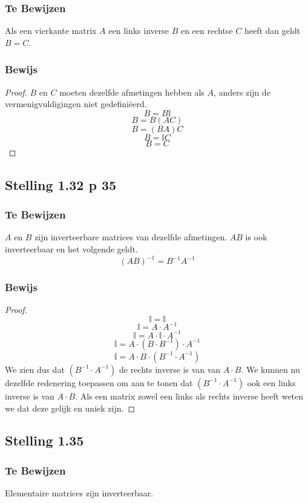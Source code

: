 \documentclass[lineaire_algebra_oplossingen.tex]{subfiles}
\begin{document}
\subsubsection*{Te Bewijzen}
Als een vierkante matrix $A$ een links inverse $B$ en een rechtse $C$ heeft dan geldt $B=C$.

\subsubsection*{Bewijs}
\begin{proof}
$B$ en $C$ moeten dezelfde afmetingen hebben als $A$, anders zijn de vermenigvuldigingen niet gedefini\"eerd.
\[B = B\mathbb{I}\]
\[B = B (AC)\]
\[B = (BA)C\]
\[B = \mathbb{I}C\]
\[B = C\]
\end{proof}


\subsection{Stelling 1.32 p 35}
\label{1.32}
\subsubsection*{Te Bewijzen}
$A$ en $B$ zijn inverteerbare matrices van dezelfde afmetingen. $AB$ is ook inverteerbaar en het volgende geldt.
\[
(AB)^{-1} = B^{-1}A^{-1}
\]

\subsubsection*{Bewijs}
\begin{proof}

$$\mathbb{I} = \mathbb{I}$$
$$\mathbb{I} = A\cdot A^{-1}$$
$$\mathbb{I} = A\cdot \mathbb{I} \cdot A^{-1}$$
$$\mathbb{I} = A\cdot (B\cdot B^{-1}) \cdot A^{-1}$$
$$\mathbb{I} = A\cdot B\cdot (B^{-1} \cdot A^{-1})$$
We zien dus dat $(B^{-1} \cdot A^{-1})$ de rechts inverse is van van $A \cdot B$. We kunnen nu dezelfde redenering toepassen om aan te tonen dat $(B^{-1} \cdot A^{-1})$ ook een links inverse is van $A \cdot B$. Als een matrix zowel een links als rechts inverse heeft weten we dat deze gelijk en uniek zijn.
\end{proof}


\subsection{Stelling 1.35}
\label{1.35}
\subsubsection*{Te Bewijzen}
Elementaire matrices zijn inverteerbaar.
\end{document}
